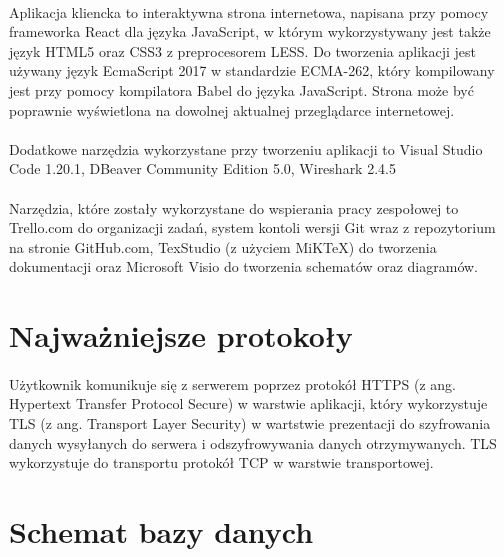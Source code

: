 \documentclass{article}
\begin{document}
	\paragraph*{} Aplikacja kliencka to interaktywna strona internetowa, napisana przy pomocy frameworka React dla języka JavaScript, w którym wykorzystywany jest także język HTML5 oraz CSS3 z preprocesorem LESS. Do tworzenia aplikacji jest używany język EcmaScript 2017 w standardzie ECMA-262, który kompilowany jest przy pomocy kompilatora Babel do języka JavaScript. Strona może być poprawnie wyświetlona na dowolnej aktualnej przeglądarce internetowej.
	\paragraph*{} Dodatkowe narzędzia wykorzystane przy tworzeniu aplikacji to Visual Studio Code 1.20.1, DBeaver Community Edition 5.0, Wireshark 2.4.5
	\paragraph*{} Narzędzia, które zostały wykorzystane do wspierania pracy zespołowej to Trello.com do organizacji zadań, system kontoli wersji Git wraz z repozytorium na stronie GitHub.com, TexStudio (z użyciem MiKTeX) do tworzenia dokumentacji oraz Microsoft Visio do tworzenia schematów oraz diagramów.
	\section{Najważniejsze protokoły}
	\paragraph*{}
	Użytkownik komunikuje się z serwerem poprzez protokół HTTPS (z ang. Hypertext Transfer Protocol Secure) w warstwie aplikacji, który wykorzystuje TLS (z ang. Transport Layer Security) w wartstwie prezentacji do szyfrowania danych wysyłanych do serwera i odszyfrowywania danych otrzymywanych. TLS wykorzystuje do transportu protokół TCP w warstwie transportowej.
	\section{Schemat bazy danych}
\end{document}
